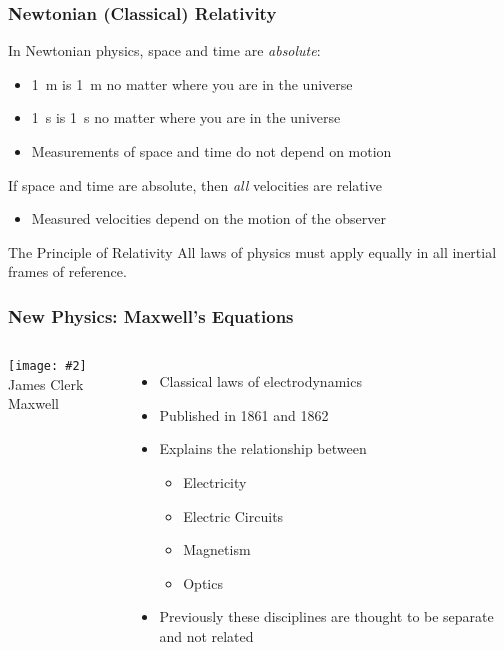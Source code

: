 \documentclass[12pt,compress,aspectratio=169]{beamer}
\newcommand{\pic}[2]{\texttt{[image: \#2]}}
\begin{document}
\begin{frame}
  \frametitle{Newtonian (Classical) Relativity}

  In Newtonian physics, space and time are \emph{absolute}:
  \begin{itemize}
  \item \SI{1}{m} is \SI{1}{m} no matter where you are in the universe
  \item \SI{1}{s} is \SI{1}{s} no matter where you are in the universe
  \item Measurements of space and time do not depend on motion
  \end{itemize}
  If space and time are absolute, then \emph{all} velocities are relative
  \begin{itemize}
  \item Measured velocities depend on the motion of the observer
  \end{itemize}

  \vspace{.2in}
  \begin{block}{The Principle of Relativity}
    All laws of physics must apply equally in all inertial frames of reference.
  \end{block}
\end{frame}

\begin{frame}
  \frametitle{New Physics: Maxwell's Equations}
  \begin{columns}
    \begin{center}
      \pic{1}{graphics/PORTRAIT-James-Clerk-Maxwell.jpg}\\
      James Clerk Maxwell
    \end{center}
    \begin{itemize}
    \item Classical laws of electrodynamics
    \item Published in 1861 and 1862
    \item Explains the relationship between
      \begin{itemize}
      \item Electricity
      \item Electric Circuits
      \item Magnetism
      \item Optics
      \end{itemize}
    \item Previously these disciplines are thought to be separate and not
      related
    \end{itemize}
  \end{columns}
\end{frame}
\end{document}
